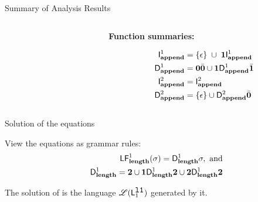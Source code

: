 \documentclass[xcolor=x11names,compress,mathserif]{beamer}
\renewcommand{\(}{\begin{columns}}
\renewcommand{\)}{\end{columns}}
\newcommand{\<}[1]{\begin{column}{#1}}
\renewcommand{\>}{\end{column}}
\begin{document}
\begin{frame}[t]{Summary of Analysis Results}
\begin{columns}[c]
\begin{column}[T]{0.33\textwidth}
\end{column}
\begin{column}[T]{0.33\textwidth}
\vspace*{1.5cm}
\centerline{\bf Function summaries:}
{\red
\begin{align*}
        \mathsf{I}_{\mathit {\mathbf{append}}}^{1} &= \{\epsilon\}\;  \cup\;
      \mathbf{1}\mathsf{I}_{\mathit {\mathbf{append}}}^{1}\\
  \mathsf{D}_{\mathit {\mathbf{append}}}^{1} &= \mathbf{0}\bar{\mathbf{0}}\cup\mathbf{1} \mathsf{D}_{\mathit {\mathbf{append}}}^{1}\bar{\mathbf{1}}\\
  \mathsf{I}_{\mathit {\mathbf{append}}}^{2} &= \mathsf{I}_{\mathit {\mathbf{append}}}^{2}\\
  \mathsf{D}_{\mathit {\mathbf{append}}}^{2} &= \{\epsilon\} \cup \mathsf{D}_{\mathit {\mathbf{append}}}^{2}\bar{\mathbf{0}}
  \end{align*}}
  \end{column}
\end{columns}
\end{frame}

\begin{frame}{Solution of the equations}

  View the equations as grammar rules:
 \begin{eqnarray*}
&&  \mathsf{LF}_{\mathit {\mathbf{length}} }^{1}( {\mathit \sigma}) = \mathsf{D}_{\mathit {\mathbf{length}}}^{1}\sigma,~\mbox{and}\\
&&   \mathsf{D}_{\mathit {\mathbf{length}}}^{1} = {\mathbf{2}} \cup \mathbf{1}\mathsf{D}_{\mathit {\mathbf{length}}}^{1}{\mathbf{2}}
       \cup {\mathbf{2}}\mathsf{D}_{\mathit {\mathbf{length}}}^{1}{{\mathbf{2}}}
 \end{eqnarray*}

The  solution of  is the   language  $\mathscr{L}(\mathsf{L}_{{1}}^{\mbox{\tt l1}})$ generated    by    it.
\end{frame}

\end{document}
